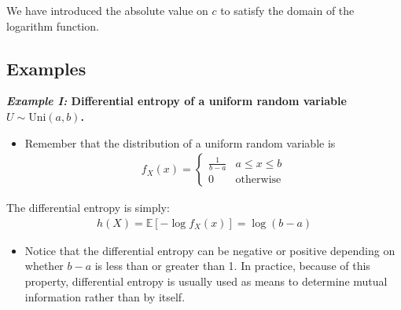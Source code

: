 \documentclass[12pt]{extarticle}
\newcommand{\EE}{\mathbb{E}}
\newcommand{\eq}[1]{\begin{align*}#1\end{align*}}
\begin{document}
We have introduced the absolute value on $c$ to satisfy the domain of the logarithm function.

\subsection{Examples}
\textbf{\textit{Example I:} Differential entropy of a uniform random variable $U \sim \text{Uni}(a, b)$.}
\begin{itemize}
\item Remember that the distribution of a uniform random variable is \eq{f_X(x) = \begin{cases}
\frac{1}{b - a} & a \leq x \leq b \\
0 & \text{otherwise}
\end{cases}}
\end{itemize}
The differential entropy is simply:
 \eq{h(X) = \EE[ - \log f_X (x)] = \log (b - a)}
\begin{itemize}
\item Notice that the differential entropy can be negative or positive depending on whether $b - a$ is less than or greater than 1. In practice, because of this property, differential entropy is usually used as means to determine mutual information rather than by itself.
\end{itemize}
\end{document}
